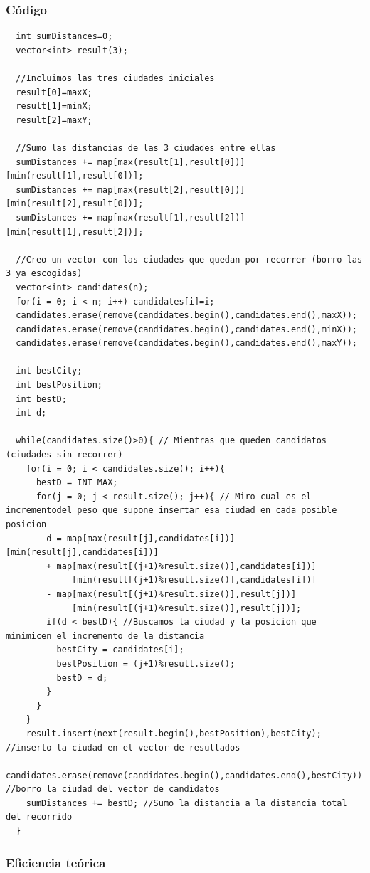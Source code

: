 \documentclass[a4]{article}
\begin{document}
\subsubsection{Código}

\begin{lstlisting}
  int sumDistances=0;
  vector<int> result(3);

  //Incluimos las tres ciudades iniciales 
  result[0]=maxX;
  result[1]=minX;
  result[2]=maxY;

  //Sumo las distancias de las 3 ciudades entre ellas
  sumDistances += map[max(result[1],result[0])][min(result[1],result[0])];
  sumDistances += map[max(result[2],result[0])][min(result[2],result[0])];
  sumDistances += map[max(result[1],result[2])][min(result[1],result[2])];

  //Creo un vector con las ciudades que quedan por recorrer (borro las 3 ya escogidas)
  vector<int> candidates(n);
  for(i = 0; i < n; i++) candidates[i]=i;
  candidates.erase(remove(candidates.begin(),candidates.end(),maxX));
  candidates.erase(remove(candidates.begin(),candidates.end(),minX));
  candidates.erase(remove(candidates.begin(),candidates.end(),maxY));
  
  int bestCity;
  int bestPosition;
  int bestD;
  int d;

  while(candidates.size()>0){ // Mientras que queden candidatos (ciudades sin recorrer)
    for(i = 0; i < candidates.size(); i++){
      bestD = INT_MAX;
      for(j = 0; j < result.size(); j++){ // Miro cual es el incrementodel peso que supone insertar esa ciudad en cada posible posicion
        d = map[max(result[j],candidates[i])][min(result[j],candidates[i])]
        + map[max(result[(j+1)%result.size()],candidates[i])]
             [min(result[(j+1)%result.size()],candidates[i])]
        - map[max(result[(j+1)%result.size()],result[j])]
             [min(result[(j+1)%result.size()],result[j])];
        if(d < bestD){ //Buscamos la ciudad y la posicion que minimicen el incremento de la distancia
          bestCity = candidates[i];
          bestPosition = (j+1)%result.size();
          bestD = d;
        }
      }
    }
    result.insert(next(result.begin(),bestPosition),bestCity); //inserto la ciudad en el vector de resultados
    candidates.erase(remove(candidates.begin(),candidates.end(),bestCity)); //borro la ciudad del vector de candidatos
    sumDistances += bestD; //Sumo la distancia a la distancia total del recorrido
  }
\end{lstlisting}

\subsubsection{Eficiencia teórica}
\end{document}
